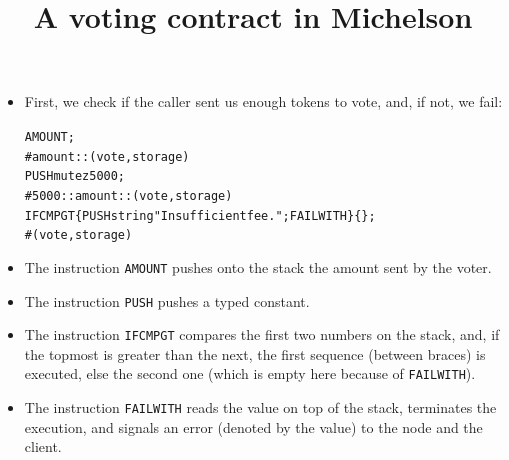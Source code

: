 \documentclass[wide]{slides}
\begin{document}
\begin{slide}
  \title{A voting contract in Michelson}

  \begin{itemize}

    \item First, we check if the caller sent us enough tokens to
      vote, and, if not, we fail:
      \begin{alltt}
          AMOUNT;
          # amount::(vote, storage)
          PUSH mutez 5000;
          # 5000::amount::(vote, storage)
          IFCMPGT \{ PUSH string "Insufficient fee."; FAILWITH \} \{\};
          # (vote, storage)
      \end{alltt}

    \item The instruction \texttt{AMOUNT} pushes onto the stack the
      amount sent by the voter.

    \item The instruction \texttt{PUSH} pushes a typed constant.

    \item The instruction \texttt{IFCMPGT} compares the first two
      numbers on the stack, and, if the topmost is greater than the
      next, the first sequence (between braces) is executed, else the
      second one (which is empty here because of \texttt{FAILWITH}).

    \item The instruction \texttt{FAILWITH} reads the value on top of
      the stack, terminates the execution, and signals an error
      (denoted by the value) to the node and the client.

  \end{itemize}

\end{slide}
\end{document}
